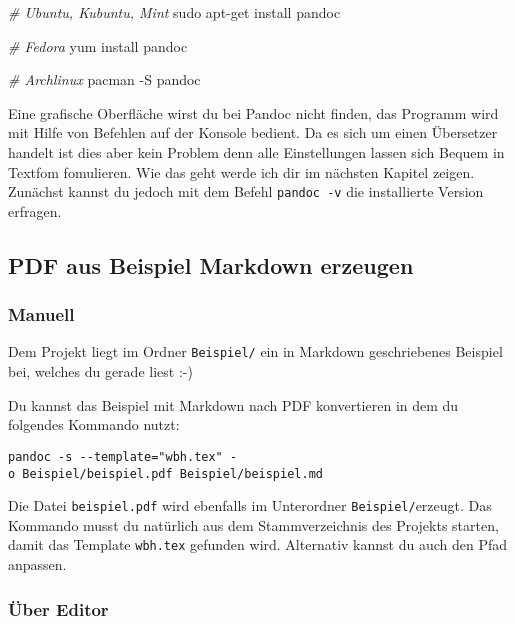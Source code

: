 \documentclass[
    12pt,
    a4paper,
            ngerman,
        bibliography=totocnumbered,
    listof=totocnumbered
]{scrartcl}
\newenvironment{Shaded}{}{}
\newcommand{\AttributeTok}[1]{\textcolor[rgb]{0.49,0.56,0.16}{#1}}
\newcommand{\CommentTok}[1]{\textcolor[rgb]{0.38,0.63,0.69}{\textit{#1}}}
\newcommand{\ExtensionTok}[1]{#1}
\newcommand{\FunctionTok}[1]{\textcolor[rgb]{0.02,0.16,0.49}{#1}}
\newcommand{\NormalTok}[1]{#1}
\begin{document}
\begin{Shaded}
\begin{Highlighting}[]
\CommentTok{\# Ubuntu, Kubuntu, Mint}
\FunctionTok{sudo}\NormalTok{ apt{-}get install pandoc}

\CommentTok{\# Fedora}
\ExtensionTok{yum}\NormalTok{ install pandoc}

\CommentTok{\# Archlinux}
\ExtensionTok{pacman} \AttributeTok{{-}S}\NormalTok{ pandoc}
\end{Highlighting}
\end{Shaded}

Eine grafische Oberfläche wirst du bei Pandoc nicht finden, das Programm
wird mit Hilfe von Befehlen auf der Konsole bedient. Da es sich um einen
Übersetzer handelt ist dies aber kein Problem denn alle Einstellungen
lassen sich Bequem in Textfom fomulieren. Wie das geht werde ich dir im
nächsten Kapitel zeigen. Zunächst kannst du jedoch mit dem Befehl
\texttt{pandoc\ -v} die installierte Version erfragen.

\hypertarget{pdf-aus-beispiel-markdown-erzeugen}{%
\subsection{PDF aus Beispiel Markdown
erzeugen}\label{pdf-aus-beispiel-markdown-erzeugen}}

\hypertarget{manuell}{%
\subsubsection{Manuell}\label{manuell}}

Dem Projekt liegt im Ordner \texttt{Beispiel/} ein in Markdown
geschriebenes Beispiel bei, welches du gerade liest :-)

Du kannst das Beispiel mit Markdown nach PDF konvertieren in dem du
folgendes Kommando nutzt:

\texttt{pandoc\ -s\ -\/-template="wbh.tex"\ -o\ Beispiel/beispiel.pdf\ Beispiel/beispiel.md}

Die Datei \texttt{beispiel.pdf} wird ebenfalls im Unterordner
\texttt{Beispiel/}erzeugt. Das Kommando musst du natürlich aus dem
Stammverzeichnis des Projekts starten, damit das Template
\texttt{wbh.tex} gefunden wird. Alternativ kannst du auch den Pfad
anpassen.

\hypertarget{uxfcber-editor}{%
\subsubsection{Über Editor}\label{uxfcber-editor}}
\end{document}

